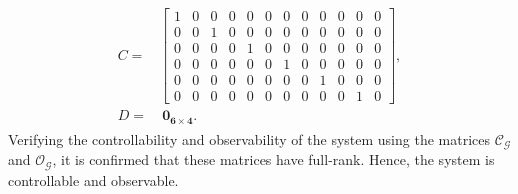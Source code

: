 \begin{align}
\begin{split}
C = & 
\begin{bmatrix}
1 & 0 & 0 & 0 & 0 & 0 & 0 & 0 & 0 & 0 & 0 & 0 \\[2px]
0 & 0 & 1 & 0 & 0 & 0 & 0 & 0 & 0 & 0 & 0 & 0 \\[2px]
0 & 0 & 0 & 0 & 1 & 0 & 0 & 0 & 0 & 0 & 0 & 0 \\[2px]
0 & 0 & 0 & 0 & 0 & 0 & 1 & 0 & 0 & 0 & 0 & 0 \\[2px]
0 & 0 & 0 & 0 & 0 & 0 & 0 & 0 & 1 & 0 & 0 & 0 \\[2px]
0 & 0 & 0 & 0 & 0 & 0 & 0 & 0 & 0 & 0 & 1 & 0
\end{bmatrix}, \\[15px]
D = &\ \mathbf{0_{6\times 4}}.
\end{split}
\end{align}
Verifying the controllability and observability of the system using the matrices $\mathcal{C_G}$ and $\mathcal{O_G}$, it is confirmed that these matrices have full-rank. Hence, the system is controllable and observable.

